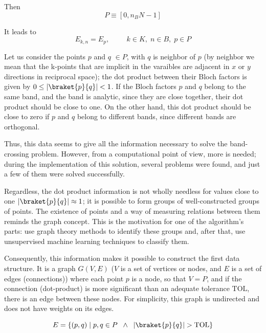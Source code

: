 \documentclass[a4paper,12pt]{report}
\begin{document}
\begin{appendices}
Then
\begin{equation}
    P \equiv \left[0, n_B N -1\right]
\end{equation}

It leads to
\begin{equation}
    E_{k,n} = E_p,\hspace{1cm} k\in K, \; n\in B,\; p\in P
\end{equation}

Let us consider the points $p$ and $q$ $\in P$, with $q$ is neighbor of $p$
(by neighbor we mean that the k-points that are implicit in the varaibles are adjacent in $x$ or $y$ directions in reciprocal space);
the dot product between their Bloch factors is given by $0\leq \left|\braket{p}{q}\right|< 1$.
If the Bloch factors $p$ and $q$ belong to the same band, and the band is analytic, since they are close together, their dot product should be close to one.
On the other hand, this dot product should be close to zero if $p$ and $q$ belong to different bands, since different bands are orthogonal.

Thus, this data seems to give all the information necessary to solve the band-crossing problem.
However, from a computational point of view, more is needed;
during the implementation of this solution, several problems were found, and just a few of them were solved successfully.

Regardless, the dot product information is not wholly needless for values close to one $\left|\braket{p}{q}\right|\approx 1$;
it is possible to form groups of well-constructed groups of points.
The existence of points and a way of measuring relations between them reminds the graph concept.
This is the motivation for one of the algorithm's parts:
use graph theory methods to identify these groups and, after that, use unsupervised machine learning techniques to classify them.

Consequently, this information makes it possible to construct the first data structure.
It is a graph $G(V, E)$ ($V$ is a set of vertices or nodes, and $E$ is a set of edges (connections)) where each point $p$ is a node, so that $V=P$, and if the connection (dot-product) is more significant than an adequate tolerance $\mathrm{TOL}$, there is an edge between these nodes.
For simplicity, this graph is undirected and does not have weights on its edges.

\begin{equation}
    E = \left\{(p,q)\;|\;p,q\in P \;\;\wedge\;\; \left|\braket{p}{q}\right| > \mathrm{TOL}\right\}
\end{equation}


\end{appendices}
\end{document}

